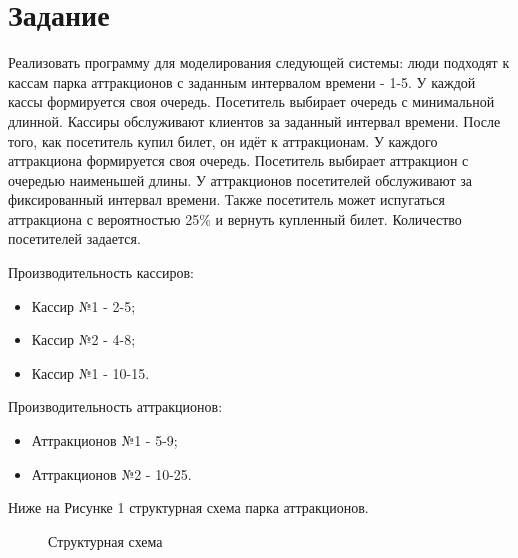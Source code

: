 \documentclass[14pt, a4paper]{extarticle}
\begin{document}
	\section*{Задание}
	Реализовать программу для моделирования следующей системы: люди подходят к кассам парка аттракционов с заданным интервалом времени - 1-5. У каждой кассы формируется своя очередь. Посетитель выбирает очередь с минимальной длинной. Кассиры обслуживают клиентов за заданный интервал времени. После того, как посетитель купил билет, он идёт к аттракционам. У каждого аттракциона формируется своя очередь. Посетитель выбирает аттракцион с очередью наименьшей длины. У аттракционов посетителей обслуживают за фиксированный интервал времени. Также посетитель может испугаться аттракциона с вероятностью 25\% и вернуть купленный билет. Количество посетителей задается.\par
	Производительность кассиров:
	\begin{itemize}
		\item Кассир №1 - 2-5;
		\item Кассир №2 - 4-8;
		\item Кассир №1 - 10-15.
	\end{itemize}\par

	Производительность аттракционов:
	\begin{itemize}
		\item Аттракционов №1 - 5-9;
		\item Аттракционов №2 - 10-25.
	\end{itemize}\par
	
	\newpage
	Ниже на Рисунке 1 структурная схема парка аттракционов. 
	\begin{figure}[h!]
		\centering\caption{Структурная схема}
	\end{figure}
	
\end{document}
